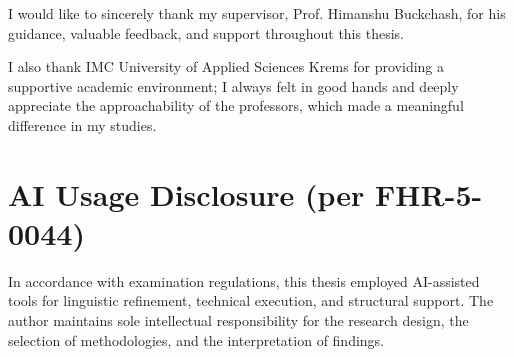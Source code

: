 \documentclass{imc-inf}
\begin{document}
\begin{abstract}
The contributions of this thesis are: (1) a fingerprint-based LOSO model caching framework that ensures cache correctness and prevents cross-fold contamination; (2) quantified efficiency gains, demonstrating a median speedup of 54$\times$ for XGBoost and 11.6$\times$ for Random Forest across 128 LOSO folds; and (3) validated reproducibility, where all cached models yielded identical classification results to those obtained through cold retraining.
\end{abstract}

\begin{acknowledgements}
I would like to sincerely thank my supervisor, Prof. Himanshu Buckchash, for his guidance, valuable feedback, and support throughout this thesis.

I also thank IMC University of Applied Sciences Krems for providing a supportive academic environment; I always felt in good hands and deeply appreciate the approachability of the professors, which made a meaningful difference in my studies.
\end{acknowledgements}

\newpage
\thispagestyle{plain} 
\section*{AI Usage Disclosure (per FHR-5-0044)}
\noindent
In accordance with examination regulations, this thesis employed AI-assisted tools for linguistic refinement, technical execution, and structural support. The author maintains sole intellectual responsibility for the research design, the selection of methodologies, and the interpretation of findings. 
\end{document}

